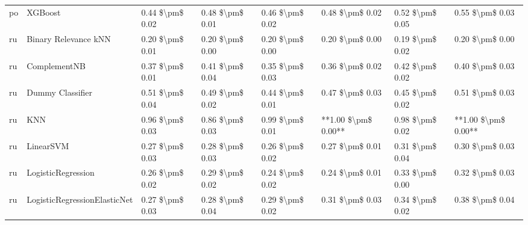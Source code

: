 \begin{tabular}{llllllll}
      po &                         XGBoost &     0.44 \$\textbackslash pm\$ 0.02 &           0.48 \$\textbackslash pm\$ 0.01 &       0.46 \$\textbackslash pm\$ 0.02 &        0.48 \$\textbackslash pm\$ 0.02 &                         0.52 \$\textbackslash pm\$ 0.05 &     0.55 \$\textbackslash pm\$ 0.03 \\
      ru &            Binary Relevance kNN &     0.20 \$\textbackslash pm\$ 0.01 &           0.20 \$\textbackslash pm\$ 0.00 &       0.20 \$\textbackslash pm\$ 0.00 &        0.20 \$\textbackslash pm\$ 0.00 &                         0.19 \$\textbackslash pm\$ 0.02 &     0.20 \$\textbackslash pm\$ 0.00 \\
      ru &                    ComplementNB &     0.37 \$\textbackslash pm\$ 0.01 &           0.41 \$\textbackslash pm\$ 0.04 &       0.35 \$\textbackslash pm\$ 0.03 &        0.36 \$\textbackslash pm\$ 0.02 &                         0.42 \$\textbackslash pm\$ 0.02 &     0.40 \$\textbackslash pm\$ 0.03 \\
      ru &                Dummy Classifier &     0.51 \$\textbackslash pm\$ 0.04 &           0.49 \$\textbackslash pm\$ 0.02 &       0.44 \$\textbackslash pm\$ 0.01 &        0.47 \$\textbackslash pm\$ 0.03 &                         0.45 \$\textbackslash pm\$ 0.02 &     0.51 \$\textbackslash pm\$ 0.03 \\
      ru &                             KNN &     0.96 \$\textbackslash pm\$ 0.03 &           0.86 \$\textbackslash pm\$ 0.03 &       0.99 \$\textbackslash pm\$ 0.01 &    **1.00 \$\textbackslash pm\$ 0.00** &                         0.98 \$\textbackslash pm\$ 0.02 & **1.00 \$\textbackslash pm\$ 0.00** \\
      ru &                       LinearSVM &     0.27 \$\textbackslash pm\$ 0.03 &           0.28 \$\textbackslash pm\$ 0.03 &       0.26 \$\textbackslash pm\$ 0.02 &        0.27 \$\textbackslash pm\$ 0.01 &                         0.31 \$\textbackslash pm\$ 0.04 &     0.30 \$\textbackslash pm\$ 0.03 \\
      ru &              LogisticRegression &     0.26 \$\textbackslash pm\$ 0.02 &           0.29 \$\textbackslash pm\$ 0.02 &       0.24 \$\textbackslash pm\$ 0.02 &        0.24 \$\textbackslash pm\$ 0.01 &                         0.33 \$\textbackslash pm\$ 0.00 &     0.32 \$\textbackslash pm\$ 0.03 \\
      ru &    LogisticRegressionElasticNet &     0.27 \$\textbackslash pm\$ 0.03 &           0.28 \$\textbackslash pm\$ 0.04 &       0.29 \$\textbackslash pm\$ 0.02 &        0.31 \$\textbackslash pm\$ 0.03 &                         0.34 \$\textbackslash pm\$ 0.02 &     0.38 \$\textbackslash pm\$ 0.04 \\

\end{tabular}

